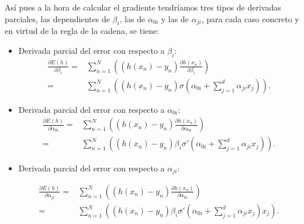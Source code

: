 Así pues a la hora de calcular el gradiente tendríamos tres tipos de derivadas parciales, las dependientes de $\beta_i$, 
las de $\alpha_{0 i}$ y las de $\alpha_{j i}$, para cada caso concreto y en virtud de la regla de la cadena, se tiene: 
\begin{itemize}
    \item Derivada parcial del error con respecto a $\beta_i$:
    \begin{align} \label{eq:parcial_beta}
        \frac{\partial E(h)}{\partial \beta_i} 
        =&
        \sum_{n = 1}^N \left(
            \left(h(x_n) - y_n\right)
            \frac{\partial h(x_n)}{\partial \beta_i} 
        \right)
        \\ 
        = &
        \sum_{n = 1}^N \left(
            \left(h(x_n) - y_n\right)
            \sigma
            \left(  
                \alpha_{0 i} +
                \sum_{j=1}^d \alpha_{j i}x_j
            \right)
        \right).
    \end{align}

    \item Derivada parcial del error con respecto a $\alpha_{0 i}$:
    \begin{align} \label{eq:parcial_alpha_cero}
        \frac{\partial E(h)}{\partial \alpha_{0 i}} 
        =&
        \sum_{n = 1}^N \left(
            \left(h(x_n) - y_n\right)
            \frac{\partial h(x_n)}{\partial \alpha_{0 i}} 
        \right)
        \\ 
        = &
        \sum_{n = 1}^N \left(
            \left(h(x_n) - y_n\right)
            \beta_i
            \sigma'
            \left(  
                \alpha_{0 i} +
                \sum_{j=1}^d \alpha_{j i}x_j
            \right)
        \right).
    \end{align}

    \item Derivada parcial del error con respecto a $\alpha_{j i}$:
    
    \begin{align} \label{eq:parcial_alpha_i}
        \frac{\partial E(h)}{\partial \alpha_{j i}} 
        =&
        \sum_{n = 1}^N \left(
            \left(h(x_n) - y_n\right)
            \frac{\partial h(x_n)}{\partial \alpha_{0 i}} 
        \right)
        \\ 
        = &
        \sum_{n = 1}^N \left(
            \left(h(x_n) - y_n\right)
            \beta_i
            \sigma'
            \left(  
                \alpha_{0 i} +
                \sum_{j=1}^d \alpha_{j i}x_j
            \right) x_j
        \right).
    \end{align}
\end{itemize}  

